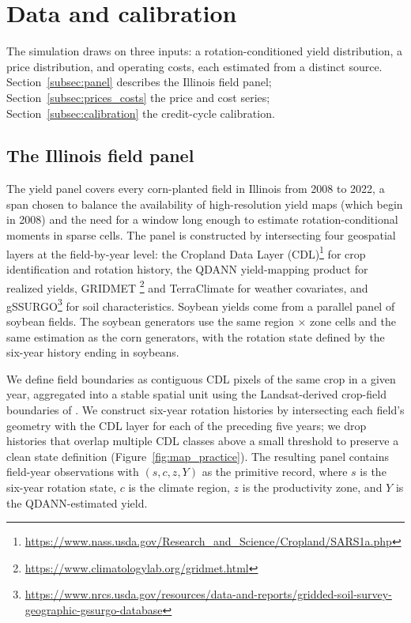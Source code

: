\documentclass[11pt,letterpaper]{article}
\theoremstyle{remark}
\begin{document}
\section{\label{sec:data}Data and calibration}
 
The simulation draws on three inputs: a rotation-conditioned yield distribution, a price distribution, and operating costs, each estimated from a distinct source. Section~\ref{subsec:panel} describes the Illinois field panel; Section~\ref{subsec:prices_costs} the price and cost series; Section~\ref{subsec:calibration} the credit-cycle calibration.
 
\subsection{\label{subsec:panel}The Illinois field panel}
 
The yield panel covers every corn-planted field in Illinois from 2008 to 2022, a span chosen to balance the availability of high-resolution yield maps (which begin in 2008) and the need for a window long enough to estimate rotation-conditional moments in sparse cells. The panel is constructed by intersecting four geospatial layers at the field-by-year level: the Cropland Data Layer (CDL)\footnote{\url{https://www.nass.usda.gov/Research_and_Science/Cropland/SARS1a.php}} for crop identification and rotation history, the QDANN yield-mapping product \citep{Ma2024} for realized yields, GRIDMET \citep{Abatzoglou2013}\footnote{\url{https://www.climatologylab.org/gridmet.html}} and TerraClimate \citep{Abatzoglou2018} for weather covariates, and gSSURGO\footnote{\url{https://www.nrcs.usda.gov/resources/data-and-reports/gridded-soil-survey-geographic-gssurgo-database}} for soil characteristics. Soybean yields come from a parallel panel of soybean fields. The soybean generators use the same region $\times$ zone cells and the same estimation as the corn generators, with the rotation state defined by the six-year history ending in soybeans.
 
We define field boundaries as contiguous CDL pixels of the same crop in a given year, aggregated into a stable spatial unit using the Landsat-derived crop-field boundaries of \citet{Yan2016}. We construct six-year rotation histories by intersecting each field's geometry with the CDL layer for each of the preceding five years; we drop histories that overlap multiple CDL classes above a small threshold to preserve a clean state definition (Figure~\ref{fig:map_practice}). The resulting panel contains field-year observations with $(s, c, z, Y)$ as the primitive record, where $s$ is the six-year rotation state, $c$ is the climate region, $z$ is the productivity zone, and $Y$ is the QDANN-estimated yield.
 
\end{document}
